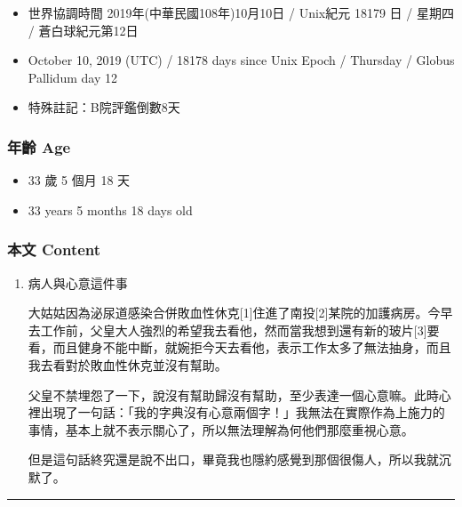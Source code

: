 \documentclass[
]{article}
\providecommand{\tightlist}{%
  \setlength{\itemsep}{0pt}\setlength{\parskip}{0pt}}
\begin{document}
\begin{itemize}
\tightlist
\item
  世界協調時間 2019年(中華民國108年)10月10日 / Unix紀元 18179 日 /
  星期四 / 蒼白球紀元第12日
\item
  October 10, 2019 (UTC) / 18178 days since Unix Epoch / Thursday /
  Globus Pallidum day 12
\item
  特殊註記：B院評鑑倒數8天
\end{itemize}

\hypertarget{ux5e74ux9f61-age-11}{%
\subsubsection{年齡 Age}\label{ux5e74ux9f61-age-11}}

\begin{itemize}
\tightlist
\item
  33 歲 5 個月 18 天
\item
  33 years 5 months 18 days old
\end{itemize}

\hypertarget{ux672cux6587-content-11}{%
\subsubsection{本文 Content}\label{ux672cux6587-content-11}}

\begin{enumerate}
\def\labelenumi{\arabic{enumi}.}
\item
  病人與心意這件事

  大姑姑因為泌尿道感染合併敗血性休克{[}1{]}住進了南投{[}2{]}某院的加護病房。今早去工作前，父皇大人強烈的希望我去看他，然而當我想到還有新的玻片{[}3{]}要看，而且健身不能中斷，就婉拒今天去看他，表示工作太多了無法抽身，而且我去看對於敗血性休克並沒有幫助。

  父皇不禁埋怨了一下，說沒有幫助歸沒有幫助，至少表達一個心意嘛。此時心裡出現了一句話：「我的字典沒有心意兩個字！」我無法在實際作為上施力的事情，基本上就不表示關心了，所以無法理解為何他們那麼重視心意。

  但是這句話終究還是說不出口，畢竟我也隱約感覺到那個很傷人，所以我就沉默了。
\end{enumerate}

\begin{center}\rule{0.5\linewidth}{\linethickness}\end{center}
\end{document}
